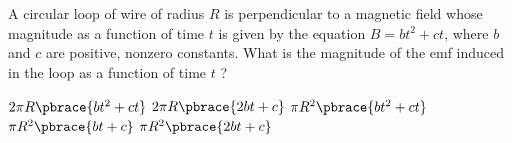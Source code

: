 \begin{questions}\setcounter{question}{6}\question
A circular loop of wire of radius $R$ is perpendicular to a magnetic field whose magnitude as a function of time $t$ is given by the equation $B=b t^{2}+c t$, where $b$ and $c$ are positive, nonzero constants. What is the magnitude of the emf induced in the loop as a function of time $t$ ?

\begin{choices}
\choice $2 \pi R   \pbrace{b t^{2}+c t}$
\choice $2 \pi R   \pbrace{2 b t+c}$
\choice $\pi R^{2} \pbrace{b t^{2}+c t}$
\choice $\pi R^{2} \pbrace{b t+c}$
\choice $\pi R^{2} \pbrace{2 b t+c}$
\end{choices}\end{questions}


